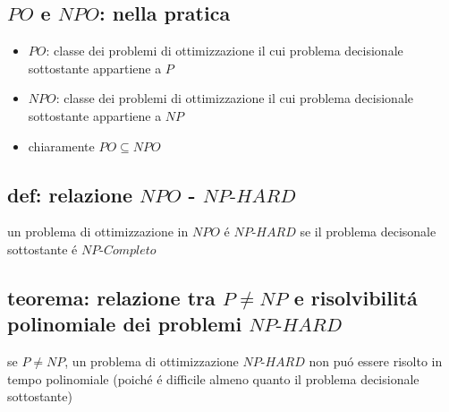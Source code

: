 
\subsection*{$PO$ e $NPO$: nella pratica}
\begin{flushleft}
	\begin{itemize}
		\item $PO$: classe dei problemi di ottimizzazione il cui problema decisionale sottostante appartiene a $P$
		\item $NPO$: classe dei problemi di ottimizzazione il cui problema decisionale sottostante appartiene a $NP$
		\item chiaramente $PO\subseteq NPO$
	\end{itemize}
\end{flushleft}


\subsection*{def: relazione $NPO$ - $NP\text{-}HARD$}
\begin{flushleft}
	un problema di ottimizzazione in $NPO$ \'e $NP\text{-}HARD$ se il problema decisonale sottostante \'e $NP\text{-}Completo$
\end{flushleft}


\subsection*{teorema: relazione tra $P\neq NP$ e risolvibilit\'a polinomiale dei problemi $NP\text{-}HARD$}
\begin{flushleft}
	se $P\neq NP$, un problema di ottimizzazione $NP\text{-}HARD$ non pu\'o essere risolto in tempo polinomiale (poich\'e \'e difficile almeno quanto il problema decisionale sottostante)
\end{flushleft}


